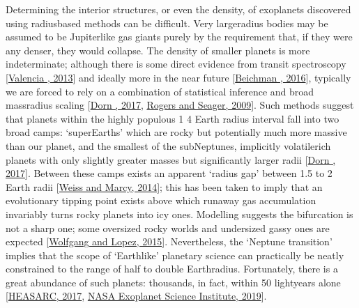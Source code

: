 \documentclass[letterpaper,10pt,english]{jupyterBook}
\begin{document}
\sphinxAtStartPar
Determining the interior structures, or even the density, of exoplanets discovered using radius\sphinxhyphen{}based methods can be difficult. Very large\sphinxhyphen{}radius bodies may be assumed to be Jupiter\sphinxhyphen{}like gas giants purely by the requirement that, if they were any denser, they would collapse. The density of smaller planets is more indeterminate; although there is some direct evidence from transit spectroscopy {[}\hyperlink{cite.references:id579}{Valencia , 2013}{]} and ideally more in the near future {[}\hyperlink{cite.references:id573}{Beichman , 2016}{]}, typically we are forced to rely on a combination of statistical inference and broad mass\sphinxhyphen{}radius scaling {[}\hyperlink{cite.references:id343}{Dorn , 2017}, \hyperlink{cite.references:id313}{Rogers and Seager, 2009}{]}. Such methods suggest that planets within the highly populous 1 \sphinxhyphen{} 4 Earth radius interval fall into two broad camps: ‘super\sphinxhyphen{}Earths’ which are rocky but potentially much more massive than our planet, and the smallest of the sub\sphinxhyphen{}Neptunes, implicitly volatile\sphinxhyphen{}rich planets with only slightly greater masses but significantly larger radii {[}\hyperlink{cite.references:id344}{Dorn , 2017}{]}. Between these camps exists an apparent ‘radius gap’ between 1.5 to 2 Earth radii {[}\hyperlink{cite.references:id572}{Weiss and Marcy, 2014}{]}; this has been taken to imply that an evolutionary tipping point exists above which runaway gas accumulation invariably turns rocky planets into icy ones. Modelling suggests the bifurcation is not a sharp one; some oversized rocky worlds and undersized gassy ones are expected {[}\hyperlink{cite.references:id578}{Wolfgang and Lopez, 2015}{]}. Nevertheless, the ‘Neptune transition’ implies that the scope of ‘Earth\sphinxhyphen{}like’ planetary science can practically be neatly constrained to the range of half to double Earth\sphinxhyphen{}radius. Fortunately, there is a great abundance of such planets: thousands, in fact, within 50 lightyears alone {[}\hyperlink{cite.references:id2}{HEASARC, 2017}, \hyperlink{cite.references:id12}{NASA Exoplanet Science Institute, 2019}{]}.
\end{document}
